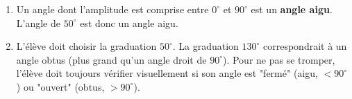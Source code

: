 %
%
\begin{enumerate}
    \item Un angle dont l'amplitude est comprise entre $0^\circ$ et $90^\circ$ est un \textbf{angle aigu}. L'angle de $50^\circ$ est donc un angle aigu.
    \item L'élève doit choisir la graduation $50^\circ$. La graduation $130^\circ$ correspondrait à un angle obtus (plus grand qu'un angle droit de $90^\circ$). Pour ne pas se tromper, l'élève doit toujours vérifier visuellement si son angle est "fermé" (aigu, $<90^\circ$) ou "ouvert" (obtus, $>90^\circ$).
\end{enumerate}
